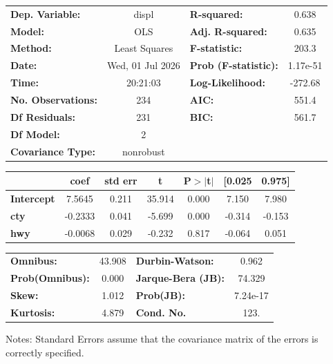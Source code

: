 \begin{center}
\begin{tabular}{lclc}
\toprule
\textbf{Dep. Variable:}    &      displ       & \textbf{  R-squared:         } &     0.638   \\
\textbf{Model:}            &       OLS        & \textbf{  Adj. R-squared:    } &     0.635   \\
\textbf{Method:}           &  Least Squares   & \textbf{  F-statistic:       } &     203.3   \\
\textbf{Date:}             & Wed, 01 Jul 2026 & \textbf{  Prob (F-statistic):} &  1.17e-51   \\
\textbf{Time:}             &     20:21:03     & \textbf{  Log-Likelihood:    } &   -272.68   \\
\textbf{No. Observations:} &         234      & \textbf{  AIC:               } &     551.4   \\
\textbf{Df Residuals:}     &         231      & \textbf{  BIC:               } &     561.7   \\
\textbf{Df Model:}         &           2      & \textbf{                     } &             \\
\textbf{Covariance Type:}  &    nonrobust     & \textbf{                     } &             \\
\bottomrule
\end{tabular}
\begin{tabular}{lcccccc}
                   & \textbf{coef} & \textbf{std err} & \textbf{t} & \textbf{P$> |$t$|$} & \textbf{[0.025} & \textbf{0.975]}  \\
\midrule
\textbf{Intercept} &       7.5645  &        0.211     &    35.914  &         0.000        &        7.150    &        7.980     \\
\textbf{cty}       &      -0.2333  &        0.041     &    -5.699  &         0.000        &       -0.314    &       -0.153     \\
\textbf{hwy}       &      -0.0068  &        0.029     &    -0.232  &         0.817        &       -0.064    &        0.051     \\
\bottomrule
\end{tabular}
\begin{tabular}{lclc}
\textbf{Omnibus:}       & 43.908 & \textbf{  Durbin-Watson:     } &    0.962  \\
\textbf{Prob(Omnibus):} &  0.000 & \textbf{  Jarque-Bera (JB):  } &   74.329  \\
\textbf{Skew:}          &  1.012 & \textbf{  Prob(JB):          } & 7.24e-17  \\
\textbf{Kurtosis:}      &  4.879 & \textbf{  Cond. No.          } &     123.  \\
\bottomrule
\end{tabular}
\end{center}

Notes: \newline
 [1] Standard Errors assume that the covariance matrix of the errors is correctly specified.